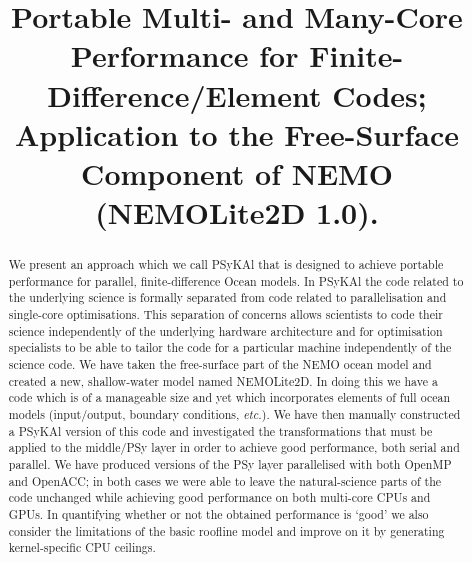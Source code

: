 \documentclass[gmdd, manuscript]{copernicus}
\begin{document}
\title{Portable Multi- and Many-Core Performance for Finite-Difference/Element Codes;
  Application to the Free-Surface Component of NEMO (NEMOLite2D 1.0).}







\received{}
\pubdiscuss{} %
\revised{}
\accepted{}
\published{}

\maketitle

\begin{abstract}

We present an approach which we call {PS}y{KA}l that is designed to achieve
portable performance for parallel, finite-difference Ocean models.  In
{PS}y{KA}l the code related to the underlying science is formally
separated from code related to parallelisation and single-core
optimisations. This separation of concerns allows scientists to code
their science independently of the underlying hardware architecture
and for optimisation specialists to be able to tailor the code for a
particular machine independently of the science code. We have taken
the free-surface part of the NEMO ocean model and created a new,
shallow-water model named NEMOLite2D. In doing this we have a code
which is of a manageable size and yet which incorporates elements of
full ocean models (input/output, boundary conditions, \textit{etc.}).
We have then manually constructed a {PS}y{KA}l version of this code and
investigated the transformations that must be applied to the
middle/PSy layer in order to achieve good performance, both serial and
parallel. We have produced versions of the PSy layer parallelised with
both OpenMP and OpenACC; in both cases we were able to leave the
natural-science parts of the code unchanged while achieving good
performance on both multi-core CPUs and GPUs. In quantifying whether
or not the obtained performance is `good' we also consider the
limitations of the basic roofline model and improve on it
by generating kernel-specific CPU ceilings.

\end{abstract}
\end{document}

